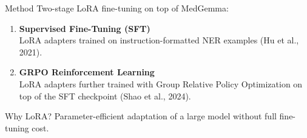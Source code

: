 \begin{frame}{Method}
  Two-stage LoRA fine-tuning on top of MedGemma:
  \begin{enumerate}
    \item \textbf{Supervised Fine-Tuning (SFT)} \\
      LoRA adapters trained on instruction-formatted NER examples (Hu et al., 2021).
    \item \textbf{GRPO Reinforcement Learning} \\
      LoRA adapters further trained with Group Relative Policy Optimization on top of the SFT checkpoint (Shao et al., 2024).
  \end{enumerate}
  \vfill
  \begin{block}{Why LoRA?}
    Parameter-efficient adaptation of a large model without full fine-tuning cost.
  \end{block}
\end{frame}
